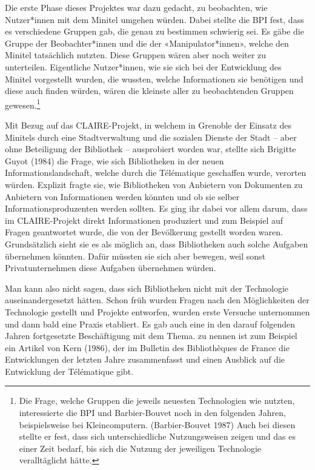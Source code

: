 \documentclass[a4paper,
fontsize=11pt,
oneside,
numbers=noperiodatend,
parskip=half-,
bibliography=totoc,
final
]{scrartcl}
\begin{document}
Die erste Phase dieses Projektes war dazu gedacht, zu beobachten, wie
Nutzer*innen mit dem Minitel umgehen würden. Dabei stellte die BPI fest,
dass es verschiedene Gruppen gab, die genau zu bestimmen schwierig sei.
Es gäbe die Gruppe der Beobachter*innen und die der «Manipulator*innen»,
welche den Minitel tatsächlich nutzten. Diese Gruppen wären aber noch
weiter zu unterteilen. Eigentliche Nutzer*innen, wie sie sich bei der
Entwicklung des Minitel vorgestellt wurden, die wussten, welche
Informationen sie benötigen und diese auch finden würden, wären die
kleinste aller zu beobachtenden Gruppen gewesen.\footnote{Die Frage,
  welche Gruppen die jeweils neuesten Technologien wie nutzten,
  interessierte die BPI und Barbier-Bouvet noch in den folgenden Jahren,
  beispielsweise bei Kleincomputern. (Barbier-Bouvet 1987) Auch bei
  diesen stellte er fest, dass sich unterschiedliche Nutzungsweisen
  zeigen und das es einer Zeit bedarf, bis sich die Nutzung der
  jeweiligen Technologie veralltäglicht hätte.}

Mit Bezug auf das CLAIRE-Projekt, in welchem in Grenoble der Einsatz des
Minitels durch eine Stadtverwaltung und die sozialen Dienste der Stadt
-- aber ohne Beteiligung der Bibliothek -- ausprobiert worden war,
stellte sich Brigitte Guyot (1984) die Frage, wie sich Bibliotheken in
der neuen Informationslandschaft, welche durch die Télématique
geschaffen wurde, verorten würden. Explizit fragte sie, wie Bibliotheken
von Anbietern von Dokumenten zu Anbietern von Informationen werden
könnten und ob sie selber Informationsproduzenten werden sollten. Es
ging ihr dabei vor allem darum, dass im CLAIRE-Projekt direkt
Informationen produziert und zum Beispiel auf Fragen geantwortet wurde,
die von der Bevölkerung gestellt worden waren. Grundsätzlich sieht sie
es als möglich an, dass Bibliotheken auch solche Aufgaben übernehmen
könnten. Dafür müssten sie sich aber bewegen, weil sonst
Privatunternehmen diese Aufgaben übernehmen würden.

Man kann also nicht sagen, dass sich Bibliotheken nicht mit der
Technologie auseinandergesetzt hätten. Schon früh wurden Fragen nach den
Möglichkeiten der Technologie gestellt und Projekte entworfen, wurden
erste Versuche unternommen und dann bald eine Praxis etabliert. Es gab
auch eine in den darauf folgenden Jahren fortgesetzte Beschäftigung mit
dem Thema. zu nennen ist zum Beispiel ein Artikel von Kern (1986), der
im Bulletin des Bibliothèques de France die Entwicklungen der letzten
Jahre zusammenfasst und einen Ausblick auf die Entwicklung der
Télématique gibt.
\end{document}
